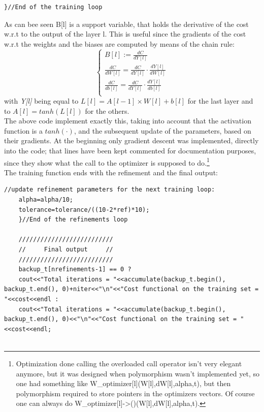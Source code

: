 \documentclass[12pt, a4paper]{report}
\theoremstyle{definition}
\begin{document}
{\begin{lstlisting}[frame=single]
}//End of the training loop
\end{lstlisting}
\noindent As can bee seen {\ttfamily B[l]} is a support variable, that holds the derivative of the cost w.r.t to the output of the layer {\ttfamily l}. This is useful since the gradients of the cost w.r.t the weights and the biases are computed by means of the chain rule:
\begin{equation*}
	\begin{cases}
	B[l] := \frac{dC}{dY[l]}\\ 
	\frac{dC}{dW[l]} = \frac{dC}{dY[l]} \cdot \frac{dY[l]}{dW[l]} \\
	\frac{dC}{db[l]} = \frac{dC}{dY[l]} \cdot \frac{dY[l]}{db[l]} \\
	\end{cases}
\end{equation*} 
with \textit{Y[l]} being equal to $L[l]=A[l-1]\times W[l]+b[l]$ for the last layer and to $A[l]=tanh(L[l])$ for the others.\\
The above code implement exactly this, taking into account that the activation function is a $tanh(\cdot)$, and the subsequent update of the parameters, based on their gradients. At the beginning only gradient descent was implemented, directly into the code; that lines have been kept commented for documentation purposes, since they show what the call to the optimizer is supposed to do.\footnote{Optimization done calling the overloaded call operator isn't very elegant anymore, but it was designed when polymorphism wasn't implemented yet, so one had something like {\ttfamily W\_optimizer[l](W[l],dW[l],alpha,t)}, but then polymorphism required to store pointers in the optimizers vectors. Of course one can always do {\ttfamily W\_optimizer[l]->()(W[l],dW[l],alpha,t)}.}\\
The training function ends with the refinement and the final output:
\begin{lstlisting}[frame=single, showstringspaces=false]
	//update refinement parameters for the next training loop:
	alpha=alpha/10;
	tolerance=tolerance/((10-2*ref)*10);
	}//End of the refinements loop

	//////////////////////////
	//     Final output     //
	//////////////////////////
	backup_t[nrefinements-1] == 0 ? 
	cout<<"Total iterations = "<<accumulate(backup_t.begin(), backup_t.end(), 0)+niter<<"\n"<<"Cost functional on the training set = "<<cost<<endl :
	cout<<"Total iterations = "<<accumulate(backup_t.begin(), backup_t.end(), 0)<<"\n"<<"Cost functional on the training set = "<<cost<<endl;


\end{lstlisting}}
\end{document}
